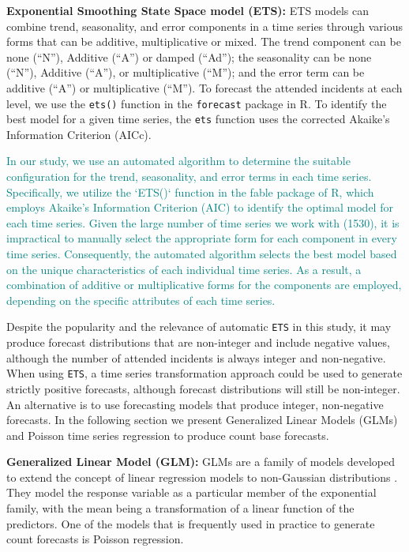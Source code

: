 \documentclass[
  authoryear,
  preprint,
  3p]{elsarticle}
\begin{document}
\textbf{Exponential Smoothing State Space model (ETS):} ETS models
\citep{hyndman2021forecasting} can combine trend, seasonality, and error
components in a time series through various forms that can be additive,
multiplicative or mixed. The trend component can be none (``N''),
Additive (``A'') or damped (``Ad''); the seasonality can be none
(``N''), Additive (``A''), or multiplicative (``M''); and the error term
can be additive (``A'') or multiplicative (``M''). To forecast the
attended incidents at each level, we use the \texttt{ets()} function in
the \texttt{forecast} package \citep{Rforecast, HK08} in R. To identify
the best model for a given time series, the \texttt{ets} function uses
the corrected Akaike's Information Criterion (AICc).

\textcolor{teal}{In our study, we use an automated algorithm to determine the suitable configuration for the trend, seasonality, and error terms in each time series. Specifically, we utilize the `ETS()` function in the fable package of R, which employs Akaike's Information Criterion (AIC) to identify the optimal model for each time series. Given the large number of time series we work with (1530), it is impractical to manually select the appropriate form for each component in every time series. Consequently, the automated algorithm selects the best model based on the unique characteristics of each individual time series. As a result, a combination of additive or multiplicative forms for the components are employed, depending on the specific attributes of each time series.}

Despite the popularity and the relevance of automatic \texttt{ETS} in
this study, it may produce forecast distributions that are non-integer
and include negative values, although the number of attended incidents
is always integer and non-negative. When using \texttt{ETS}, a time
series transformation approach could be used to generate strictly
positive forecasts, although forecast distributions will still be
non-integer. An alternative is to use forecasting models that produce
integer, non-negative forecasts. In the following section we present
Generalized Linear Models (GLMs) and Poisson time series regression to
produce count base forecasts.

\textbf{Generalized Linear Model (GLM):} GLMs are a family of models
developed to extend the concept of linear regression models to
non-Gaussian distributions \citep{Faraway2016}. They model the response
variable as a particular member of the exponential family, with the mean
being a transformation of a linear function of the predictors. One of
the models that is frequently used in practice to generate count
forecasts is Poisson regression.
\end{document}
